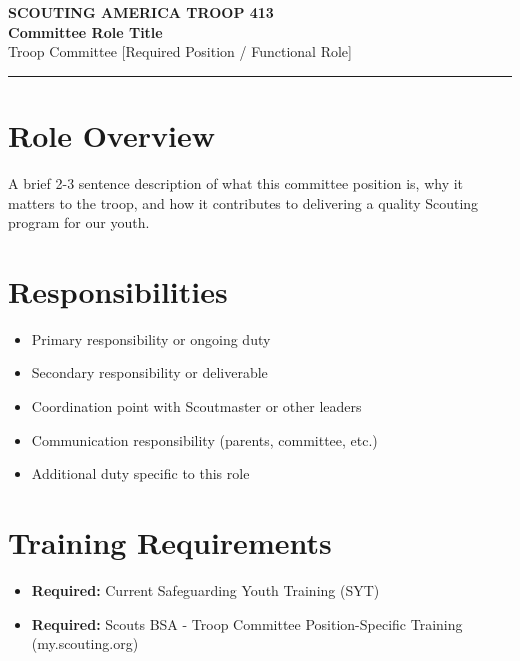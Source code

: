 \documentclass[11pt, letterpaper]{article}
\begin{document}
\begin{center}
  {\small\color{scoutgreen}\textbf{SCOUTING AMERICA \textbullet{} TROOP 413}} \\[4pt]
  {\fontsize{20pt}{24pt}\selectfont\bfseries\color{scoutgreen} Committee Role Title} \\[4pt]
  {\large\color{accent} Troop Committee \textbullet{} [Required Position / Functional Role]} \\[4pt]
  \textcolor{accent}{\rule{0.6\linewidth}{1pt}}
\end{center}

\vspace{0.5em}

\begin{minipage}[t]{0.48\linewidth}
\raggedright

\section{Role Overview}
A brief 2-3 sentence description of what this committee position is, why it matters to the troop, and how it contributes to delivering a quality Scouting program for our youth.

\vspace{0.6em}
\section{Responsibilities}
\begin{itemize}
  \item Primary responsibility or ongoing duty
  \item Secondary responsibility or deliverable
  \item Coordination point with Scoutmaster or other leaders
  \item Communication responsibility (parents, committee, etc.)
  \item Additional duty specific to this role
\end{itemize}

\section{Training Requirements}
\begin{itemize}
  \item \textbf{Required:} Current Safeguarding Youth Training (SYT)
  \item \textbf{Required:} Scouts BSA - Troop Committee Position-Specific Training (my.scouting.org)
\end{itemize}

\end{minipage}
\end{document}
